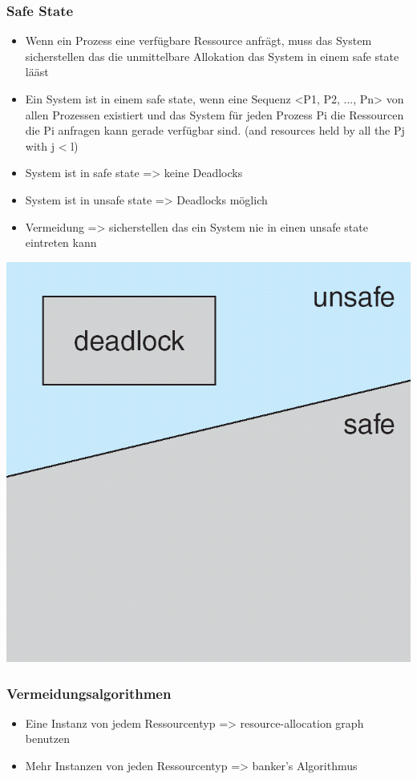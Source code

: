 \documentclass[a4paper]{scrreprt}
\begin{document}
			\subsubsection{Safe State}
				\begin{itemize}
					\item Wenn ein Prozess eine verfügbare Ressource anfrägt, muss das System sicherstellen das die unmittelbare Allokation das System in einem safe state lääst
					\item Ein System ist in einem safe state, wenn eine Sequenz <P1, P2, ..., Pn> von allen Prozessen existiert und das System für jeden Prozess Pi die Ressourcen die Pi anfragen kann gerade verfügbar sind. (and resources held by all the Pj with j < l)
				\end{itemize}
				\begin{itemize}
					\item System ist in safe state => keine Deadlocks
					\item System ist in unsafe state => Deadlocks möglich
					\item Vermeidung => sicherstellen das ein System nie in einen unsafe state eintreten kann
				\end{itemize}
				\includegraphics[scale=0.15]{graphics/state.png}
			
			\subsubsection{Vermeidungsalgorithmen}
				\begin{itemize}
					\item Eine Instanz von jedem Ressourcentyp => resource-allocation graph benutzen
					\item Mehr Instanzen von jeden Ressourcentyp => banker's Algorithmus
				\end{itemize}
\end{document}
